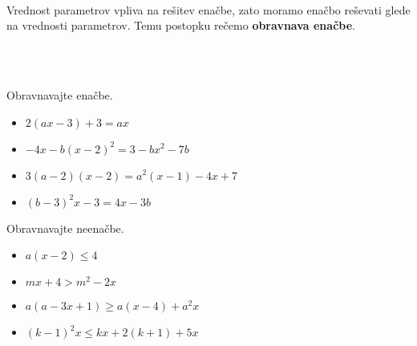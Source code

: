 ~
            
                Vrednost parametrov vpliva na rešitev enačbe, zato moramo enačbo reševati glede na vrednosti parametrov.
                Temu postopku rečemo \textbf{obravnava enačbe}.
            
        

~~\\~~

        
            \begin{naloga}
                Obravnavajte enačbe.
                \begin{itemize}
                        \item $2(ax-3)+3=ax$ 
                        \item $-4x-b(x-2)^2=3-bx^2-7b$ 
                        \item $3(a-2)(x-2)=a^2(x-1)-4x+7$ 
                        \item $(b-3)^2x-3=4x-3b$ 
                \end{itemize}
            \end{naloga}
        

        
            \begin{naloga}
                Obravnavajte neenačbe.
                \begin{itemize}
                        \item $a(x-2)\leq 4$ 
                        \item $mx+4>m^2-2x$ 
                        \item $a(a-3x+1)\geq a(x-4)+a^2x$ 
                        \item $(k-1)^2x\leq kx+2(k+1)+5x$ 
                \end{itemize}
            \end{naloga}
        

